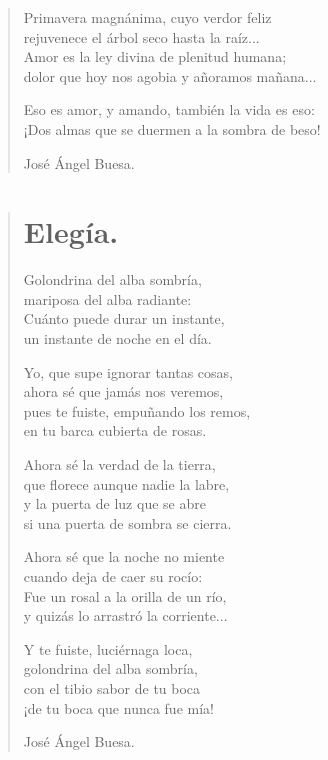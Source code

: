 \documentclass[11pt, portrait, twoside, notitlepage, openright]{book}
\begin{document}
\begin{verse}
Primavera magnánima, cuyo verdor feliz\\
rejuvenece el árbol seco hasta la raíz...\\
Amor es la ley divina de plenitud humana;\\
dolor que hoy nos agobia y añoramos mañana...
\newline

Eso es amor, y amando, también la vida es eso:\\
¡Dos almas que se duermen a la sombra de beso!
\newline

José Ángel Buesa.
\end{verse}

\newpage
\begin{verse}
\begin{center}
\section{Elegía.}
\end{center}
Golondrina del alba sombría,\\
mariposa del alba radiante:\\
Cuánto puede durar un instante,\\
un instante de noche en el día.
\newline

Yo, que supe ignorar tantas cosas,\\
ahora sé que jamás nos veremos,\\
pues te fuiste, empuñando los remos,\\
en tu barca cubierta de rosas.
\newline

Ahora sé la verdad de la tierra,\\
que florece aunque nadie la labre,\\
y la puerta de luz que se abre\\
si una puerta de sombra se cierra.
\newline

Ahora sé que la noche no miente\\
cuando deja de caer su rocío:\\
Fue un rosal a la orilla de un río,\\
y quizás lo arrastró la corriente...
\newpage

Y te fuiste, luciérnaga loca,\\
golondrina del alba sombría,\\
con el tibio sabor de tu boca\\
¡de tu boca que nunca fue mía!
\newline

José Ángel Buesa.
\end{verse}
\end{document}
